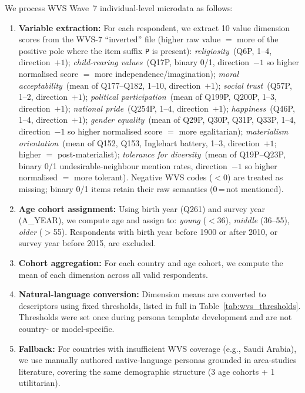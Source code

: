 \documentclass{article}
\begin{document}
We process WVS Wave~7 individual-level microdata as follows:
\begin{enumerate}
  \item \textbf{Variable extraction:} For each respondent, we extract 10 value
    dimension scores from the WVS-7 ``inverted'' file (higher raw value
    $=$ more of the positive pole where the item suffix \texttt{P} is
    present): \emph{religiosity}~(Q6P, 1--4, direction~$+1$);
    \emph{child-rearing values}~(Q17P, binary 0/1, direction~$-1$ so higher
    normalised score $=$ more independence/imagination);
    \emph{moral acceptability}~(mean of Q177--Q182, 1--10, direction~$+1$);
    \emph{social trust}~(Q57P, 1--2, direction~$+1$);
    \emph{political participation}~(mean of Q199P, Q200P, 1--3,
    direction~$+1$); \emph{national pride}~(Q254P, 1--4, direction~$+1$);
    \emph{happiness}~(Q46P, 1--4, direction~$+1$);
    \emph{gender equality}~(mean of Q29P, Q30P, Q31P, Q33P, 1--4,
    direction~$-1$ so higher normalised score $=$ more egalitarian);
    \emph{materialism orientation}~(mean of Q152, Q153, Inglehart battery,
    1--3, direction~$+1$; higher $=$ post-materialist);
    \emph{tolerance for diversity}~(mean of Q19P--Q23P, binary 0/1
    undesirable-neighbour mention rates, direction~$-1$ so higher normalised
    $=$ more tolerant). Negative WVS codes ($<0$) are treated as missing;
    binary 0/1 items retain their raw semantics (0\,=\,not mentioned).
  \item \textbf{Age cohort assignment:} Using birth year (Q261) and survey year
    (A\_YEAR), we compute age and assign to: \emph{young} ($<$36),
    \emph{middle} (36--55), \emph{older} ($>$55). Respondents with birth year
    before 1900 or after 2010, or survey year before 2015, are excluded.
  \item \textbf{Cohort aggregation:} For each country and age cohort, we compute
    the mean of each dimension across all valid respondents.
  \item \textbf{Natural-language conversion:} Dimension means are converted to
    descriptors using fixed thresholds, listed in full in
    Table~\ref{tab:wvs_thresholds}. Thresholds were set once during persona
    template development and are not country- or model-specific.
  \item \textbf{Fallback:} For countries with insufficient WVS coverage (e.g.,
    Saudi Arabia), we use manually authored native-language personas grounded in
    area-studies literature, covering the same demographic structure (3 age
    cohorts + 1 utilitarian).
\end{enumerate}
\end{document}
